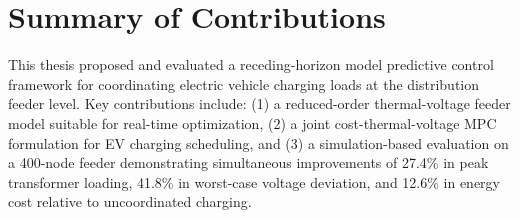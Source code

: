 \section{Summary of Contributions}
This thesis proposed and evaluated a receding-horizon model predictive control framework for
coordinating electric vehicle charging loads at the distribution feeder level. Key
contributions include: (1) a reduced-order thermal-voltage feeder model suitable for real-time
optimization, (2) a joint cost-thermal-voltage MPC formulation for EV charging scheduling, and
(3) a simulation-based evaluation on a 400-node feeder demonstrating simultaneous improvements
of 27.4\% in peak transformer loading, 41.8\% in worst-case voltage deviation, and 12.6\% in
energy cost relative to uncoordinated charging.
